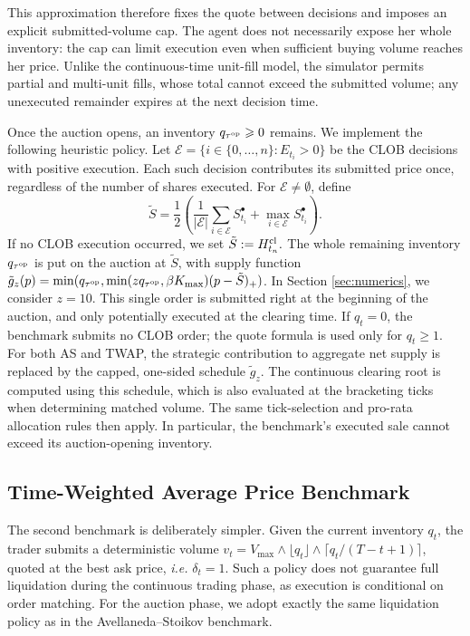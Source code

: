 \documentclass[11pt]{article}
\begin{document}
This approximation therefore fixes the quote between decisions and imposes an explicit submitted-volume cap. The agent does not necessarily expose her whole inventory: the cap can limit execution even when sufficient buying volume reaches her price. Unlike the continuous-time unit-fill model, the simulator permits partial and multi-unit fills, whose total cannot exceed the submitted volume; any unexecuted remainder expires at the next decision time.\vspace{0.5em}

Once the auction opens, an inventory $q_{\tau^{\mathrm{op}}}\geqslant  0$ remains. We implement the following heuristic policy. Let $\mathcal E=\{i\in\{0,\ldots,n\}:E_{t_i}>0\}$ be the CLOB decisions with positive execution. Each such decision contributes its submitted price once, regardless of the number of shares executed. For $\mathcal E\ne\emptyset$, define
\begingroup
\[
\tilde S=\frac12\left(\frac{1}{|\mathcal E|}\sum_{i\in\mathcal E}S_{t_i}^{\bullet}
+\max_{i\in\mathcal E}S_{t_i}^{\bullet}\right).
\]
\endgroup If no CLOB execution occurred, we set $\tilde S:=H_{t_n}^{\mathrm{cl}}.$ The whole remaining inventory $q_{\tau^{\mathrm{op}}}$ is put on the auction at $\tilde{S}$, with supply function $\tilde{g}_z(p) = \min(q_{\tau^{\mathrm{op}}}, \min(zq_{\tau^{\mathrm{op}}}, \beta K_\text{max})(p-\tilde{S})_+)$. In Section \ref{sec:numerics}, we consider $z=10$. This single order is submitted right at the beginning of the auction, and only potentially executed at the clearing time. If $q_t=0$, the benchmark submits no CLOB order; the quote formula is used only for $q_t\geqslant 1$. For both AS and TWAP, the strategic contribution to aggregate net supply is replaced by the capped, one-sided schedule $\tilde{g}_z$. The continuous clearing root is computed using this schedule, which is also evaluated at the bracketing ticks when determining matched volume. The same tick-selection and pro-rata allocation rules then apply. In particular, the benchmark's executed sale cannot exceed its auction-opening inventory.

\subsection{Time-Weighted Average Price Benchmark}\label{section:TWAP}

The second benchmark is deliberately simpler. Given the current inventory $q_t$, the trader submits a deterministic volume $v_t = V_\text{max}\wedge \lfloor q_t\rfloor \wedge  \lceil q_t/(T-t+1)\rceil$, quoted at the best ask price, \textit{i.e.} $\delta_t = 1$. Such a policy does not guarantee full liquidation during the continuous trading phase, as execution is conditional on order matching. For the auction phase, we adopt exactly the same liquidation policy as in the Avellaneda–Stoikov benchmark. 
\end{document}
